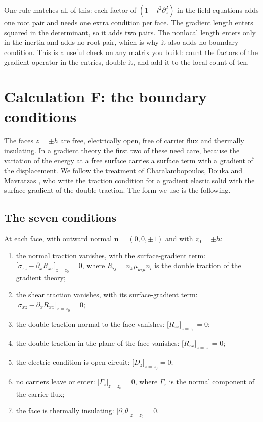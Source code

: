 \documentclass[11pt,a4paper]{article}
\begin{document}
\noindent One rule matches all of this: each factor of $(1-l^2\partial_z^2)$ in the field equations adds one
root pair and needs one extra condition per face. The gradient length enters squared in the determinant, so
it adds two pairs. The nonlocal length enters only in the inertia and adds no root pair, which is why it
also adds no boundary condition. This is a useful check on any matrix you build: count the factors of the
gradient operator in the entries, double it, and add it to the local count of ten.

\section{Calculation F: the boundary conditions}\label{sec:F}

The faces $z=\pm h$ are free, electrically open, free of carrier flux and thermally insulating. In a
gradient theory the first two of these need care, because the variation of the energy at a free surface
carries a surface term with a gradient of the displacement. We follow the treatment of Charalambopoulos,
Douka and Mavratzas \cite[Sec.~2, Eq.~(14)]{Charalambopoulos2019}, who write the traction condition for a
gradient elastic solid with the surface gradient of the double traction. The form we use is the following.

\subsection{The seven conditions}

At each face, with outward normal $\mathbf n=(0,0,\pm1)$ and with $z_0=\pm h$:

\begin{enumerate}
\item[(b1)] the normal traction vanishes, with the surface-gradient term:
$\bigl[\sigma_{zz}-\partial_x R_{xz}\bigr]_{z=z_0}=0$, where $R_{ij}=n_k\mu_{kijl}n_l$ is the double
traction of the gradient theory;
\item[(b2)] the shear traction vanishes, with its surface-gradient term:
$\bigl[\sigma_{xz}-\partial_x R_{xx}\bigr]_{z=z_0}=0$;
\item[(b3)] the double traction normal to the face vanishes: $\bigl[R_{zz}\bigr]_{z=z_0}=0$;
\item[(b4)] the double traction in the plane of the face vanishes: $\bigl[R_{zx}\bigr]_{z=z_0}=0$;
\item[(b5)] the electric condition is open circuit: $\bigl[D_z\bigr]_{z=z_0}=0$;
\item[(b6)] no carriers leave or enter: $\bigl[\Gamma_z\bigr]_{z=z_0}=0$, where $\Gamma_z$ is the normal
component of the carrier flux;
\item[(b7)] the face is thermally insulating: $\bigl[\partial_z\theta\bigr]_{z=z_0}=0$.
\end{enumerate}
\end{document}
